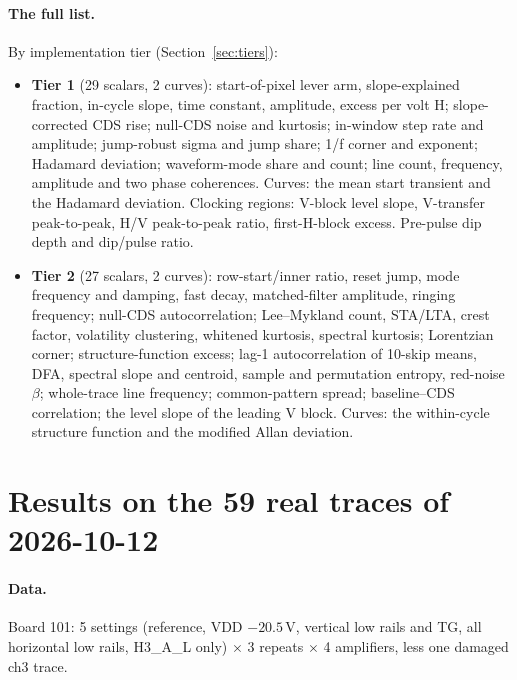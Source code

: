 \documentclass[10pt]{article}
\begin{document}
\paragraph{The full list.} By implementation tier (Section~\ref{sec:tiers}):
\begin{itemize}
  \item \textbf{Tier 1} (29 scalars, 2 curves): start-of-pixel lever arm, slope-explained fraction, in-cycle slope,
        time constant, amplitude, excess per volt H; slope-corrected CDS rise; null-CDS noise and kurtosis; in-window
        step rate and amplitude; jump-robust sigma and jump share; 1/f corner and exponent; Hadamard deviation;
        waveform-mode share and count; line count, frequency, amplitude and two phase coherences. Curves: the mean
        start transient and the Hadamard deviation. Clocking regions: V-block level slope, V-transfer
        peak-to-peak, H/V peak-to-peak ratio, first-H-block excess. Pre-pulse dip depth and dip/pulse ratio.
  \item \textbf{Tier 2} (27 scalars, 2 curves): row-start/inner ratio, reset jump, mode frequency and damping, fast
        decay, matched-filter amplitude, ringing frequency; null-CDS autocorrelation; Lee--Mykland count, STA/LTA,
        crest factor, volatility clustering, whitened kurtosis, spectral kurtosis; Lorentzian corner; structure-function
        excess; lag-1 autocorrelation of 10-skip means, DFA, spectral slope and centroid, sample and permutation
        entropy, red-noise $\beta$; whole-trace line frequency; common-pattern spread; baseline--CDS correlation; the
        level slope of the leading V block.
        Curves: the within-cycle structure function and the modified Allan deviation.
\end{itemize}

\section{Results on the 59 real traces of 2026-10-12}
\label{sec:real}

\paragraph{Data.} Board 101: 5 settings (reference, VDD $-20.5$\,V, vertical low rails and TG, all horizontal low rails,
H3\_A\_L only) $\times$ 3 repeats $\times$ 4 amplifiers, less one damaged ch3 trace.
\end{document}
